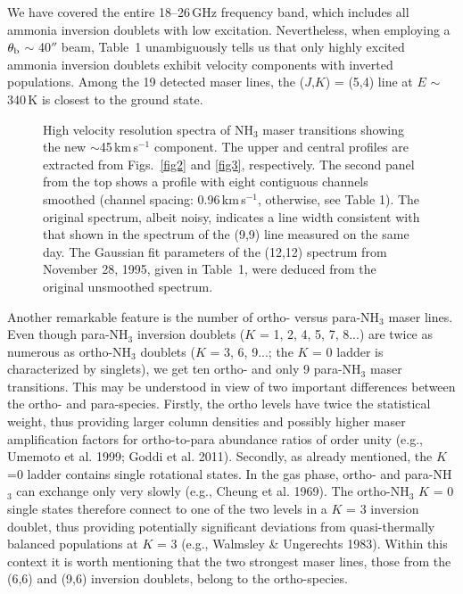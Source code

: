 \documentclass[oldversion]{aa}
\begin{document}
We have covered the entire 18--26\,GHz frequency band, which includes
all ammonia inversion doublets with low excitation. Nevertheless,
when employing a $\theta_{\rm b}$ $\sim$ 40$''$ beam, Table~1 
unambiguously tells us that only highly excited ammonia inversion 
doublets exhibit velocity components with inverted populations. 
Among the 19 detected maser lines, the ($J$,$K$) = (5,4) line at 
$E$ $\sim$ 340\,K is closest to the ground state. 


\begin{figure}[t]
\vspace{0.0cm}
\centering
{}
\vspace{-1.0cm}
\caption{High velocity resolution spectra of NH$_3$ maser transitions showing the new
$\sim$45\,km\,s$^{-1}$ component. The upper and central profiles are extracted from 
Figs.~\ref{fig2} and \ref{fig3}, respectively. The second panel from the top shows 
a profile with eight contiguous channels smoothed (channel spacing: 0.96\,km\,s$^{-1}$,
otherwise, see Table 1). The original spectrum, albeit noisy, indicates a line 
width consistent with that shown in the spectrum of the (9,9) line measured 
on the same day. The Gaussian fit parameters of the (12,12) spectrum from November 28, 
1995, given in Table~1, were deduced from the original unsmoothed spectrum.
\label{fig5}}
\end{figure}


Another remarkable feature is the number of ortho- versus para-NH$_3$
maser lines. Even though para-NH$_3$ inversion doublets ($K$ = 1, 2, 4, 
5, 7, 8...) are twice as numerous as ortho-NH$_3$ doublets ($K$ = 3, 
6, 9...; the $K$ = 0 ladder is characterized by singlets), we get 
ten ortho- and only 9 para-NH$_3$ maser transitions. This may be 
understood in view of two important differences between the ortho- 
and para-species.  Firstly, the ortho levels have twice the statistical 
weight, thus providing larger column densities and possibly higher
maser amplification factors for ortho-to-para abundance ratios
of order unity (e.g., Umemoto et al. 1999; Goddi et al. 2011). 
Secondly, as already mentioned, the $K$=0 ladder contains single 
rotational states. In the gas phase, ortho- and para-NH$_3$ can 
exchange only very slowly (e.g., Cheung et al. 1969). The 
ortho-NH$_3$ $K$ = 0 single states therefore connect to one of the 
two levels in a $K$ = 3 inversion doublet, thus providing potentially 
significant deviations from quasi-thermally balanced populations at 
$K$ = 3 (e.g., Walmsley \& Ungerechts 1983). Within this context it 
is worth mentioning that the two strongest maser lines, those from 
the (6,6) and (9,6) inversion doublets, belong to the ortho-species.
\end{document}
